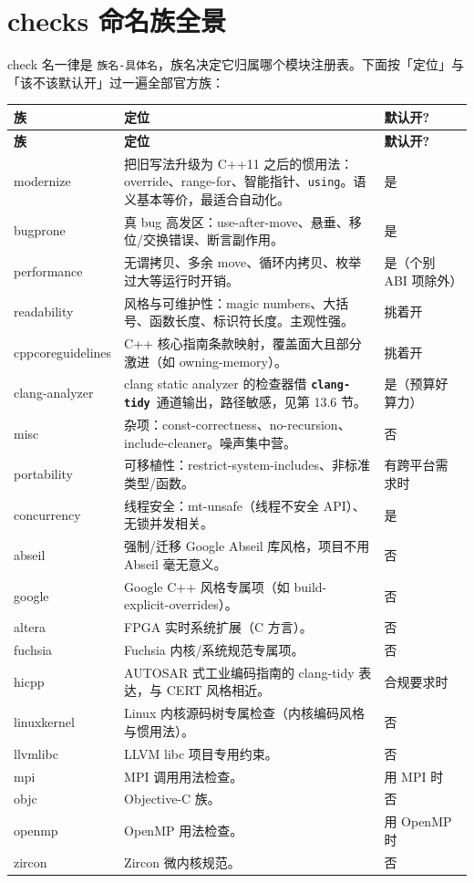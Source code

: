 \documentclass[12pt,a4paper,fontset=fandol]{ctexbook}
\newcommand{\cpp}[1]{C++#1}
\newcommand{\Lib}[1]{\textbf{\texttt{#1}}}
\newcommand{\Tidy}{\Lib{clang-tidy}}
\begin{document}
\section{checks 命名族全景}\label{sec:ch12-s3}
check 名一律是 \texttt{族名-具体名}，族名决定它归属哪个模块注册表。下面按「定位」与「该不该默认开」过一遍全部官方族：
{\small
\begin{longtable}{>{\raggedright\arraybackslash}p{} >{\raggedright\arraybackslash}p{} >{\raggedright\arraybackslash}p{}}
\textbf{族} & \textbf{定位} & \textbf{默认开?}\\ \midrule
\endfirsthead
\textbf{族} & \textbf{定位} & \textbf{默认开?}\\ \midrule
\endhead
modernize & 把旧写法升级为 \cpp{11} 之后的惯用法：override、range-for、智能指针、\texttt{using}。语义基本等价，最适合自动化。 & 是\\
bugprone & 真 bug 高发区：use-after-move、悬垂、移位/交换错误、断言副作用。 & 是\\
performance & 无谓拷贝、多余 move、循环内拷贝、枚举过大等运行时开销。 & 是（个别 ABI 项除外）\\
readability & 风格与可维护性：magic numbers、大括号、函数长度、标识符长度。主观性强。 & 挑着开\\
cppcoreguidelines & C++ 核心指南条款映射，覆盖面大且部分激进（如 owning-memory）。 & 挑着开\\
clang-analyzer & clang static analyzer 的检查器借 \Tidy\ 通道输出，路径敏感，见第 13.6 节。 & 是（预算好算力）\\
misc & 杂项：const-correctness、no-recursion、include-cleaner。噪声集中营。 & 否\\
portability & 可移植性：restrict-system-includes、非标准类型/函数。 & 有跨平台需求时\\
concurrency & 线程安全：mt-unsafe（线程不安全 API）、无锁并发相关。 & 是\\
abseil & 强制/迁移 Google Abseil 库风格，项目不用 Abseil 毫无意义。 & 否\\
google & Google C++ 风格专属项（如 build-explicit-overrides）。 & 否\\
altera & FPGA 实时系统扩展（C 方言）。 & 否\\
fuchsia & Fuchsia 内核/系统规范专属项。 & 否\\
hicpp & AUTOSAR 式工业编码指南的 clang-tidy 表达，与 CERT 风格相近。 & 合规要求时\\
linuxkernel & Linux 内核源码树专属检查（内核编码风格与惯用法）。 & 否\\
llvmlibc & LLVM libc 项目专用约束。 & 否\\
mpi & MPI 调用用法检查。 & 用 MPI 时\\
objc & Objective-C 族。 & 否\\
openmp & OpenMP 用法检查。 & 用 OpenMP 时\\
zircon & Zircon 微内核规范。 & 否\\
\end{longtable}}
\end{document}
